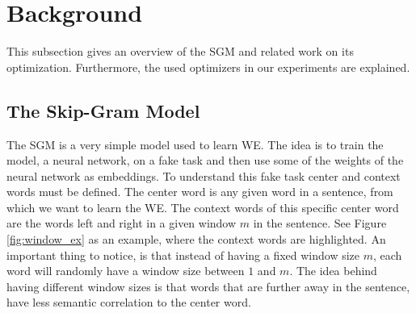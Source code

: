 \documentclass[conference]{IEEEtran}
\begin{document}
\section{Background}\label{chap:background}
This subsection gives an overview of the SGM and related work on its optimization. Furthermore, the used optimizers in our experiments are explained.
\subsection{The Skip-Gram Model}
The SGM is a very simple model used to learn WE. The idea is to train the model, a neural network, on a fake task and then use some of the weights of the neural network as embeddings. To understand this fake task center and context words must be defined. The center word is any given word in a sentence, from which we want to learn the WE. The context words of this specific center word are the words left and right in a given window $m$ in the sentence. See Figure \ref{fig:window_ex} as an example, where the context words are highlighted. An important thing to notice, is that instead of having a fixed window size $m$, each word will randomly have a window size between $1$ and $m$. The idea behind having different window sizes is that words that are further away in the sentence, have less semantic correlation to the center word.
\end{document}

